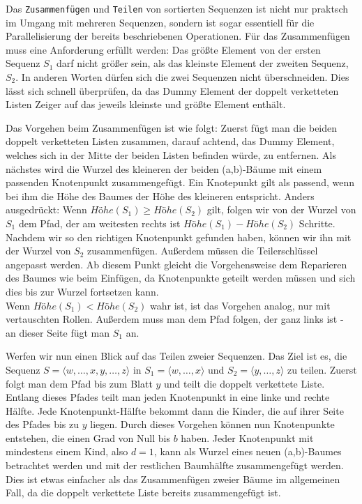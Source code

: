 Das \texttt{Zusammenfügen} und \texttt{Teilen} von sortierten Sequenzen ist nicht nur praktsch im Umgang mit mehreren Sequenzen, sondern ist sogar essentiell für die Parallelisierung der bereits beschriebenen Operationen. Für das Zusammenfügen muss eine Anforderung erfüllt werden: Das größte Element von der ersten Sequenz $S_1$ darf nicht größer sein, als das kleinste Element der zweiten Sequenz, $S_2$. In anderen Worten dürfen sich die zwei Sequenzen nicht überschneiden. Dies lässt sich schnell überprüfen, da das Dummy Element der doppelt verketteten Listen Zeiger auf das jeweils kleinste und größte Element enthält.
\par
Das Vorgehen beim Zusammenfügen ist wie folgt: Zuerst fügt man die beiden doppelt verketteten Listen zusammen, darauf achtend, das Dummy Element, welches sich in der Mitte der beiden Listen befinden würde, zu entfernen. Als nächstes wird die Wurzel des kleineren der beiden (a,b)-Bäume mit einem passenden Knotenpunkt zusammengefügt. Ein Knotepunkt gilt als passend, wenn bei ihm die Höhe des Baumes der Höhe des kleineren entspricht. Anders ausgedrückt: Wenn $Höhe(S_1) \geq Höhe(S_2)$ gilt, folgen wir von der Wurzel von $S_1$ dem Pfad, der am weitesten rechts ist $Höhe(S_1) - Höhe(S_2)$ Schritte. Nachdem wir so den richtigen Knotenpunkt gefunden haben, können wir ihn mit der Wurzel von $S_2$ zusammenfügen. Außerdem müssen die Teilerschlüssel angepasst werden. Ab diesem Punkt gleicht die Vorgehensweise dem Reparieren des Baumes wie beim Einfügen, da Knotenpunkte geteilt werden müssen und sich dies bis zur Wurzel fortsetzen kann.
\\
Wenn $Höhe(S_1) < Höhe(S_2)$ wahr ist, ist das Vorgehen analog, nur mit vertauschten Rollen. Außerdem muss man dem Pfad folgen, der ganz links ist - an dieser Seite fügt man $S_1$ an. \cite{Sanders:19}
\par
Werfen wir nun einen Blick auf das Teilen zweier Sequenzen. Das Ziel ist es, die Sequenz $S = \langle w, \dots , x,y, \dots, z \rangle$ in $S_1 = \langle w, \dots , x \rangle$ und $S_2 = \langle y, \dots , z \rangle$ zu teilen. Zuerst folgt man dem Pfad bis zum Blatt $y$ und teilt die doppelt verkettete Liste. Entlang dieses Pfades teilt man jeden Knotenpunkt in eine linke und rechte Hälfte. Jede Knotenpunkt-Hälfte bekommt dann die Kinder, die auf ihrer Seite des Pfades bis zu $y$ liegen. Durch dieses Vorgehen können nun Knotenpunkte entstehen, die einen Grad von Null bis $b$ haben. Jeder Knotenpunkt mit mindestens einem Kind, also $d = 1$, kann als Wurzel eines neuen (a,b)-Baumes betrachtet werden und mit der restlichen Baumhälfte zusammengefügt werden. Dies ist etwas einfacher als das Zusammenfügen zweier Bäume im allgemeinen Fall, da die doppelt verkettete Liste bereits zusammengefügt ist.
